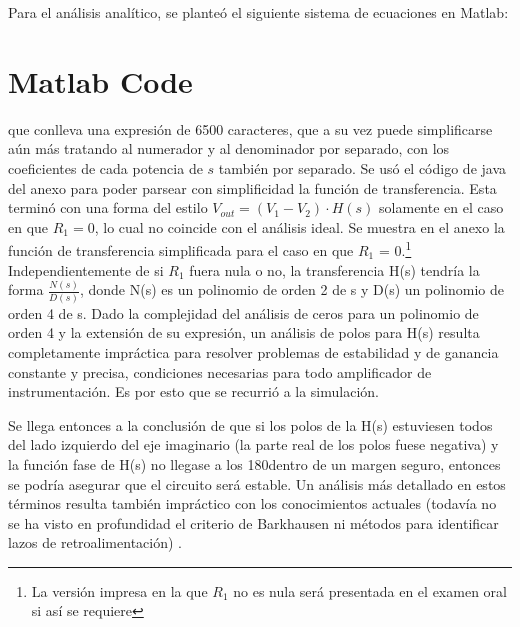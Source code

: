 \documentclass[../../tc_tp3_main.tex]{subfiles}
\begin{document}
 Para el análisis analítico, se planteó el siguiente sistema de ecuaciones en Matlab: 
 


\section*{Matlab Code}



que conlleva una expresión de 6500 caracteres, que a su vez puede simplificarse aún más tratando al numerador y al denominador por separado, con los coeficientes de cada potencia de $s$ también por separado. Se usó el código de java del anexo para poder parsear con simplificidad la función de transferencia. Esta terminó con una forma del estilo $V_{out} = (V_1 - V_2)\cdot H(s)$ solamente en el caso en que $R_1 = 0$, lo cual no coincide con el análisis ideal. Se muestra en el anexo la función de transferencia simplificada para el caso en que $R_1$ = 0.\footnote{La versión impresa en la que $R_1$ no es nula será presentada en el examen oral si así se requiere} Independientemente de si $R_1$ fuera nula o no, la transferencia H(s) tendría la forma $\frac{N(s)}{D(s)}$, donde N(s) es un polinomio de orden 2 de s y D(s) un polinomio de orden 4 de s. Dado la complejidad del análisis de ceros para un polinomio de orden 4 y la extensión de su expresión, un análisis de polos para H(s) resulta completamente impráctica para resolver problemas de estabilidad y de ganancia constante y precisa, condiciones necesarias para todo amplificador de instrumentación. Es por esto que se recurrió a la simulación. \par
Se llega entonces a la conclusión de que si los polos de la H(s) estuviesen todos del lado izquierdo del eje imaginario (la parte real de los polos fuese negativa) y la función fase de H(s) no llegase a los 180\textdegree dentro de un margen seguro, entonces se podría asegurar que el circuito será estable. Un análisis más detallado en estos términos resulta también impráctico con los conocimientos actuales (todavía no se ha visto en profundidad el criterio de Barkhausen ni métodos para identificar lazos de retroalimentación) .\par
\end{document}
